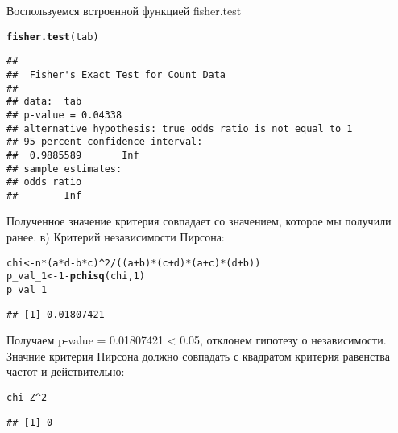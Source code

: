 \documentclass{article}\usepackage[]{graphicx}\usepackage[]{color}
\makeatletter
\newcommand{\hlnum}[1]{\textcolor[rgb]{0.686,0.059,0.569}{#1}}%
\newcommand{\hlopt}[1]{\textcolor[rgb]{0,0,0}{#1}}%
\newcommand{\hlstd}[1]{\textcolor[rgb]{0.345,0.345,0.345}{#1}}%
\newcommand{\hlkwb}[1]{\textcolor[rgb]{0.69,0.353,0.396}{#1}}%
\newcommand{\hlkwd}[1]{\textcolor[rgb]{0.737,0.353,0.396}{\textbf{#1}}}%
\newenvironment{kframe}{%
 \def\at@end@of@kframe{}%
 \ifinner\ifhmode%
  \def\at@end@of@kframe{\end{minipage}}%
  \begin{minipage}{\columnwidth}%
 \fi\fi%
 \def\FrameCommand##1{\hskip\@totalleftmargin \hskip-\fboxsep
 \colorbox{shadecolor}{##1}\hskip-\fboxsep
     \hskip-\linewidth \hskip-\@totalleftmargin \hskip\columnwidth}%
 \MakeFramed {\advance\hsize-\width
   \@totalleftmargin\z@ \linewidth\hsize
   \@setminipage}}%
 {\par\unskip\endMakeFramed%
 \at@end@of@kframe}
\newenvironment{knitrout}{}{} %
\makeatother
\begin{document}
Воспользуемся встроенной функцией fisher.test
\begin{knitrout}
\color{fgcolor}\begin{kframe}
\begin{alltt}
\hlkwd{fisher.test}\hlstd{(tab)}
\end{alltt}
\begin{verbatim}
## 
## 	Fisher's Exact Test for Count Data
## 
## data:  tab
## p-value = 0.04338
## alternative hypothesis: true odds ratio is not equal to 1
## 95 percent confidence interval:
##  0.9885589       Inf
## sample estimates:
## odds ratio 
##        Inf
\end{verbatim}
\end{kframe}
\end{knitrout}
Полученное значение критерия совпадает со значением, которое мы получили ранее.
\newpage
в) Критерий независимости Пирсона:
\begin{knitrout}
\color{fgcolor}\begin{kframe}
\begin{alltt}
\hlstd{chi} \hlkwb{<-} \hlstd{n} \hlopt{*} \hlstd{(a} \hlopt{*} \hlstd{d} \hlopt{-} \hlstd{b} \hlopt{*} \hlstd{c)}\hlopt{^}\hlnum{2} \hlopt{/} \hlstd{((a} \hlopt{+} \hlstd{b)}\hlopt{*}\hlstd{(c} \hlopt{+} \hlstd{d)}\hlopt{*}\hlstd{(a} \hlopt{+} \hlstd{c)}\hlopt{*}\hlstd{(d} \hlopt{+} \hlstd{b))}
\hlstd{p_val_1} \hlkwb{<-} \hlnum{1} \hlopt{-} \hlkwd{pchisq}\hlstd{(chi,} \hlnum{1}\hlstd{)}
\hlstd{p_val_1}
\end{alltt}
\begin{verbatim}
## [1] 0.01807421
\end{verbatim}
\end{kframe}
\end{knitrout}
Получаем p-value = 0.01807421 < 0.05, отклонем гипотезу о независимости.
Значние критерия Пирсона должно совпадать с квадратом критерия равенства частот и действительно:
\begin{knitrout}
\color{fgcolor}\begin{kframe}
\begin{alltt}
\hlstd{chi} \hlopt{-} \hlstd{Z}\hlopt{^}\hlnum{2}
\end{alltt}
\begin{verbatim}
## [1] 0
\end{verbatim}
\end{kframe}
\end{knitrout}
\end{document}
